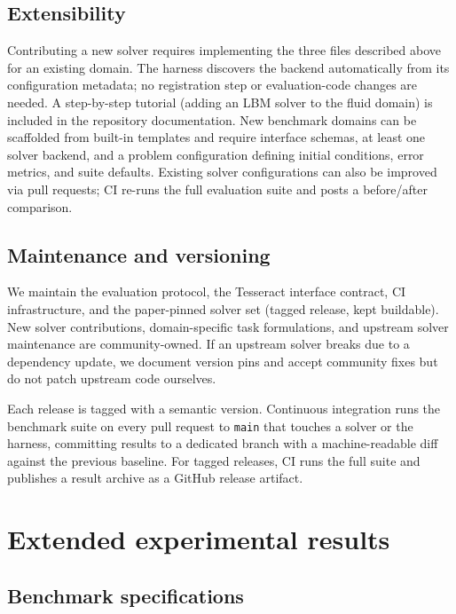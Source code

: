 \subsection{Extensibility}

Contributing a new solver requires implementing the three files described
above for an existing domain. The harness discovers the backend
automatically from its configuration metadata; no registration step or
evaluation-code changes are needed. A step-by-step tutorial (adding an LBM
solver to the fluid domain) is included in the repository documentation.
New benchmark domains can be scaffolded from built-in templates and require
interface schemas, at least one solver backend, and a problem configuration
defining initial conditions, error metrics, and suite defaults. Existing
solver configurations can also be improved via pull requests; CI re-runs
the full evaluation suite and posts a before/after comparison.

\subsection{Maintenance and versioning}

We maintain the evaluation protocol, the Tesseract interface contract, CI
infrastructure, and the paper-pinned solver set (tagged release, kept
buildable). New solver contributions, domain-specific task formulations,
and upstream solver maintenance are community-owned. If an upstream solver
breaks due to a dependency update, we document version pins and accept
community fixes but do not patch upstream code ourselves.

Each release is tagged with a semantic version. Continuous integration runs
the benchmark suite on every pull request to
\texttt{main} that touches a solver or the harness, committing results
to a dedicated branch with a machine-readable diff against the previous
baseline. For tagged releases, CI runs the full suite and publishes a result
archive as a GitHub release artifact.

\section{Extended experimental results}
\label{app:extended}

\subsection{Benchmark specifications}
\label{app:effort}

